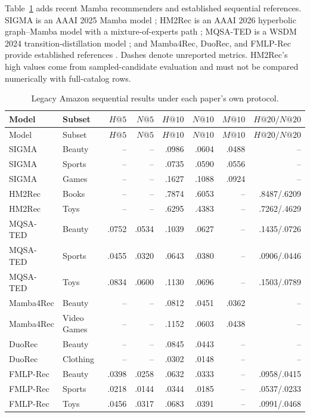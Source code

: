 Table~\ref{tab:legacy-amazon} adds recent Mamba recommenders and established
sequential references. SIGMA is an AAAI 2025 Mamba model \cite{SIGMA}; HM2Rec
is an AAAI 2026 hyperbolic graph--Mamba model with a mixture-of-experts path
\cite{HM2REC}; MQSA-TED is a WSDM 2024 transition-distillation model
\cite{MQSATED}; and Mamba4Rec, DuoRec, and FMLP-Rec provide established
references \cite{MAMBA4REC,DUOREC,FMLPREC}. Dashes denote unreported metrics.
HM2Rec's high values come from sampled-candidate evaluation and must not be
compared numerically with full-catalog rows.

\begin{longtable}{@{}p{}p{}rrrrrr@{}}
\caption{Legacy Amazon sequential results under each paper's own protocol.}
\label{tab:legacy-amazon}\\
\toprule
Model & Subset & $H@5$ & $N@5$ & $H@10$ & $N@10$ & $M@10$ & $H@20/N@20$ \\
\midrule
\endfirsthead
\toprule
Model & Subset & $H@5$ & $N@5$ & $H@10$ & $N@10$ & $M@10$ & $H@20/N@20$ \\
\midrule
\endhead
SIGMA & Beauty & -- & -- & .0986 & .0604 & .0488 & -- \\
SIGMA & Sports & -- & -- & .0735 & .0590 & .0556 & -- \\
SIGMA & Games & -- & -- & .1627 & .1088 & .0924 & -- \\
HM2Rec & Books & -- & -- & .7874 & .6053 & -- & .8487/.6209 \\
HM2Rec & Toys & -- & -- & .6295 & .4383 & -- & .7262/.4629 \\
MQSA-TED & Beauty & .0752 & .0534 & .1039 & .0627 & -- & .1435/.0726 \\
MQSA-TED & Sports & .0455 & .0320 & .0643 & .0380 & -- & .0906/.0446 \\
MQSA-TED & Toys & .0834 & .0600 & .1130 & .0696 & -- & .1503/.0789 \\
Mamba4Rec & Beauty & -- & -- & .0812 & .0451 & .0362 & -- \\
Mamba4Rec & Video Games & -- & -- & .1152 & .0603 & .0438 & -- \\
DuoRec & Beauty & -- & -- & .0845 & .0443 & -- & -- \\
DuoRec & Clothing & -- & -- & .0302 & .0148 & -- & -- \\
FMLP-Rec & Beauty & .0398 & .0258 & .0632 & .0333 & -- & .0958/.0415 \\
FMLP-Rec & Sports & .0218 & .0144 & .0344 & .0185 & -- & .0537/.0233 \\
FMLP-Rec & Toys & .0456 & .0317 & .0683 & .0391 & -- & .0991/.0468 \\
\bottomrule
\end{longtable}

